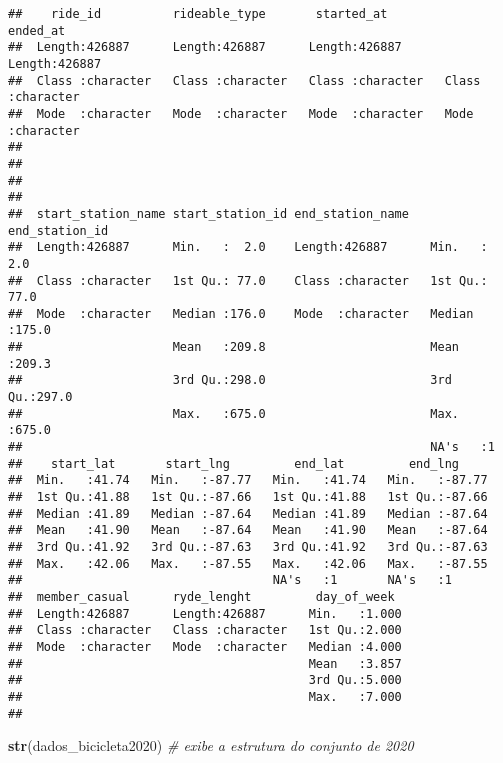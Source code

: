 \documentclass[
]{article}
\newenvironment{Shaded}{\begin{snugshade}}{\end{snugshade}}
\newcommand{\CommentTok}[1]{\textcolor[rgb]{0.56,0.35,0.01}{\textit{#1}}}
\newcommand{\FunctionTok}[1]{\textcolor[rgb]{0.13,0.29,0.53}{\textbf{#1}}}
\newcommand{\NormalTok}[1]{#1}
\begin{document}
\begin{verbatim}
##    ride_id          rideable_type       started_at          ended_at        
##  Length:426887      Length:426887      Length:426887      Length:426887     
##  Class :character   Class :character   Class :character   Class :character  
##  Mode  :character   Mode  :character   Mode  :character   Mode  :character  
##                                                                             
##                                                                             
##                                                                             
##                                                                             
##  start_station_name start_station_id end_station_name   end_station_id 
##  Length:426887      Min.   :  2.0    Length:426887      Min.   :  2.0  
##  Class :character   1st Qu.: 77.0    Class :character   1st Qu.: 77.0  
##  Mode  :character   Median :176.0    Mode  :character   Median :175.0  
##                     Mean   :209.8                       Mean   :209.3  
##                     3rd Qu.:298.0                       3rd Qu.:297.0  
##                     Max.   :675.0                       Max.   :675.0  
##                                                         NA's   :1      
##    start_lat       start_lng         end_lat         end_lng      
##  Min.   :41.74   Min.   :-87.77   Min.   :41.74   Min.   :-87.77  
##  1st Qu.:41.88   1st Qu.:-87.66   1st Qu.:41.88   1st Qu.:-87.66  
##  Median :41.89   Median :-87.64   Median :41.89   Median :-87.64  
##  Mean   :41.90   Mean   :-87.64   Mean   :41.90   Mean   :-87.64  
##  3rd Qu.:41.92   3rd Qu.:-87.63   3rd Qu.:41.92   3rd Qu.:-87.63  
##  Max.   :42.06   Max.   :-87.55   Max.   :42.06   Max.   :-87.55  
##                                   NA's   :1       NA's   :1       
##  member_casual      ryde_lenght         day_of_week   
##  Length:426887      Length:426887      Min.   :1.000  
##  Class :character   Class :character   1st Qu.:2.000  
##  Mode  :character   Mode  :character   Median :4.000  
##                                        Mean   :3.857  
##                                        3rd Qu.:5.000  
##                                        Max.   :7.000  
## 
\end{verbatim}

\begin{Shaded}
\begin{Highlighting}[]
\FunctionTok{str}\NormalTok{(dados\_bicicleta2020) }\CommentTok{\# exibe a estrutura do conjunto de 2020}
\end{Highlighting}
\end{Shaded}
\end{document}
